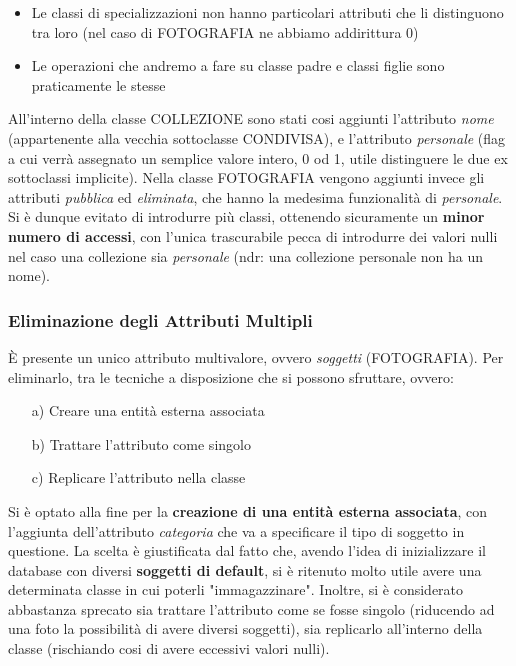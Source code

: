 \documentclass[a4paper]{article}
\begin{document}
		\begin{itemize}
			\item Le classi di specializzazioni non hanno
			particolari attributi che li distinguono tra loro
			(nel caso di FOTOGRAFIA ne abbiamo addirittura 0) 
			\item Le operazioni che andremo a fare su classe
			padre e classi figlie sono  praticamente le
			stesse
		\end{itemize}
		All'interno della classe COLLEZIONE sono stati cosi
		aggiunti l'attributo \emph{nome} (appartenente alla
		vecchia
		sottoclasse CONDIVISA),
		e
		l'attributo
		\emph{personale} (flag a cui verrà assegnato un
		semplice
		valore intero, 0 od 1, utile
		distinguere le due ex sottoclassi implicite). Nella
		classe FOTOGRAFIA vengono aggiunti invece
		gli attributi \emph{pubblica} ed \emph{eliminata},
		che
		hanno
		la medesima funzionalità di
		\emph{personale}.
		Si è dunque evitato di introdurre più classi,
		ottenendo sicuramente un \textbf{minor numero di
		accessi}, con l'unica trascurabile pecca di
		introdurre dei valori nulli nel caso una collezione
		sia \emph{personale} (ndr: una collezione personale
		non ha un nome).
		
		\vspace{20pt}
		\subsubsection{Eliminazione degli Attributi Multipli}
		\vspace{5pt}
		È presente un unico attributo multivalore, ovvero
		\emph{soggetti} (FOTOGRAFIA). Per eliminarlo, tra le
		tecniche a disposizione che si possono sfruttare,
		ovvero: 

		\begin{itemize}
			\item[a)] Creare una entità esterna associata
			\item[b)] Trattare l'attributo come singolo
			\item[c)] Replicare l'attributo nella classe
		\end{itemize}
		Si è optato alla fine per la\textbf{ creazione di una
		entità esterna associata}, con l'aggiunta
		dell'attributo
		\emph{categoria} che va a specificare il tipo di
		soggetto in
		questione. La scelta è giustificata
		dal fatto che, avendo l'idea di inizializzare il
		database con diversi \textbf{soggetti di default}, si
		è ritenuto
		molto utile avere una determinata classe
		in
		cui
		poterli
		"immagazzinare". Inoltre, si è considerato abbastanza
		sprecato sia trattare l'attributo
		come se fosse singolo (riducendo ad una foto la
		possibilità di avere diversi soggetti), sia
		replicarlo all'interno della classe (rischiando cosi
		di avere eccessivi valori nulli).
\end{document}
